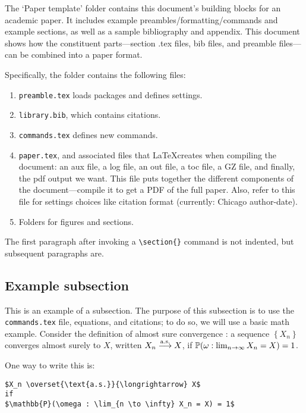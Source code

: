 

The `Paper template' folder contains this document's building blocks for an academic paper. It includes example preambles/formatting/commands and example sections, as well as a sample bibliography and appendix. This document shows how the constituent parts—section .tex files, bib files, and preamble files—can be combined into a paper format. 

Specifically, the folder contains the following files:
\begin{enumerate}
\item \Verb"preamble.tex" loads packages and defines settings.
\item  \Verb"library.bib", which contains citations.
\item \Verb"commands.tex" defines new commands. 
\item \Verb"paper.tex", and associated files that \LaTeX creates when compiling the document: an aux file, a log file, an out file, a toc file, a GZ file, and finally, the pdf output we want. This file puts together the different components of the document---compile it to get a PDF of the full paper. Also, refer to this file for settings choices like citation format (currently: Chicago author-date).
\item Folders for figures and sections.
\end{enumerate}

The first paragraph after invoking a \Verb"\section{}" command is not indented, but subsequent paragraphs are.

\subsection {Example subsection}

This is an example of a subsection. The purpose of this subsection is to use the \texttt{commands.tex} file, equations, and citations; to do so, we will use a basic math example. Consider the definition of almost sure convergence \citep{durrett2019probability}: a sequence $\left\{X_n\right\}$ converges almost surely to $X$, written $X_n \as X$, if $\P(\omega : \lim_{n \to \infty} X_n = X) = 1$.

One way to write this is:
\begin{verbatim}
$X_n \overset{\text{a.s.}}{\longrightarrow} X$ 
if 
$\mathbb{P}(\omega : \lim_{n \to \infty} X_n = X) = 1$
\end{verbatim}


